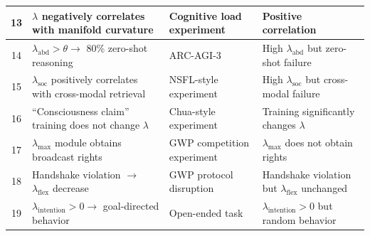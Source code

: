 \documentclass[11pt,a4paper]{article}
\theoremstyle{definition}
\theoremstyle{remark}
\begin{document}
\begin{longtable}{|c|p{3.5cm}|p{3cm}|p{4cm}|}
\hline
13 & $\lambda$ negatively correlates with manifold curvature & Cognitive load experiment & Positive correlation \\
\hline
14 & $\lambda_{\text{abd}} > \theta \rightarrow$ 80\% zero-shot reasoning & ARC-AGI-3 & High $\lambda_{\text{abd}}$ but zero-shot failure \\
\hline
15 & $\lambda_{\text{soc}}$ positively correlates with cross-modal retrieval & NSFL-style experiment & High $\lambda_{\text{soc}}$ but cross-modal failure \\
\hline
16 & ``Consciousness claim'' training does not change $\lambda$ & Chua-style experiment & Training significantly changes $\lambda$ \\
\hline
17 & $\lambda_{\text{max}}$ module obtains broadcast rights & GWP competition experiment & $\lambda_{\text{max}}$ does not obtain rights \\
\hline
18 & Handshake violation $\rightarrow$ $\lambda_{\text{flex}}$ decrease & GWP protocol disruption & Handshake violation but $\lambda_{\text{flex}}$ unchanged \\
\hline
19 & $\lambda_{\text{intention}} > 0 \rightarrow$ goal-directed behavior & Open-ended task & $\lambda_{\text{intention}} > 0$ but random behavior \\
\hline
\end{longtable}
\end{document}
